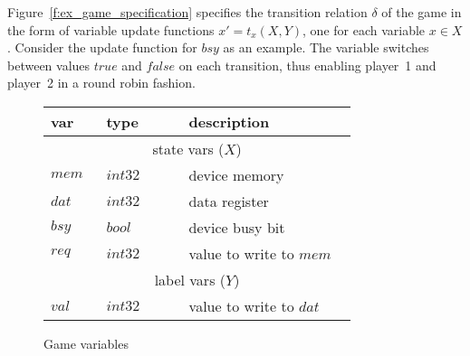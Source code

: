 Figure~\ref{f:ex_game_specification} specifies the transition relation $\delta$ of the game in the form of variable update functions $x' = t_x(X,Y)$, one for each variable $x\in X$.  Consider the update function for $bsy$ as an example.  The variable switches between values $true$ and $false$ on each transition, thus enabling player~1 and player~2 in a round robin fashion.

\begin{figure}
    \label{fig:ex_game_variables}
    \caption{Game variables}
    \begin{tabular}{|p{0.13\linewidth}p{0.22\linewidth}p{0.45\linewidth}|}
        \hline
        {\bf var} & {\bf type} & {\bf description} \\
        \hline\hline
        \multicolumn{3}{|c|}{state vars ($X$)} \\
        \hline
        $mem$ & $int32$ & device memory           \\
        $dat$ & $int32$ & data register           \\
        $bsy$ & $bool$  & device busy bit         \\
        $req$ & $int32$ & value to write to $mem$ \\
        \hline\hline
        \multicolumn{3}{|c|}{label vars ($Y$)}    \\
        \hline
        $val$ & $int32$ & value to write to $dat$ \\
        \hline
    \end{tabular}
\end{figure}

